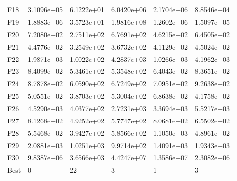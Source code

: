 \documentclass[10pt,a4paper]{article}
\begin{document}
\begin{table}[H]
\begin{center}
\begin{tabular}{llllll}
		F18  &  3.1096e+05 &  6.1222e+01 &  6.0420e+06 &  2.1704e+06 &  8.8546e+04 \\
		F19  &  1.8883e+06 &  3.5723e+01 &  1.9816e+08 &  1.2602e+06 &  1.5097e+05 \\
		F20  &  7.2080e+02 &  2.7511e+02 &  6.7691e+02 &  4.6215e+02 &  6.4505e+02 \\
		F21  &  4.4776e+02 &  3.2549e+02 &  3.6732e+02 &  4.1129e+02 &  4.5024e+02 \\
		F22  &  1.9871e+03 &  1.0022e+02 &  4.2837e+03 &  1.0266e+03 &  4.1962e+03 \\
		F23  &  8.4099e+02 &  5.3461e+02 &  5.3548e+02 &  6.4043e+02 &  8.3651e+02 \\
		F24  &  8.7878e+02 &  6.0590e+02 &  6.7249e+02 &  7.0951e+02 &  9.2638e+02 \\
		F25  &  5.0551e+02 &  3.8703e+02 &  5.3004e+02 &  6.8638e+02 &  4.1758e+02 \\
		F26  &  4.5290e+03 &  4.0377e+02 &  2.7231e+03 &  3.3694e+03 &  5.5217e+03 \\
		F27  &  8.1268e+02 &  4.9252e+02 &  5.7747e+02 &  8.0681e+02 &  6.5502e+02 \\
		F28  &  5.5468e+02 &  3.9427e+02 &  5.8566e+02 &  1.1050e+03 &  4.8961e+02 \\
		F29  &  2.0881e+03 &  1.0251e+03 &  9.9714e+02 &  1.4091e+03 &  1.9343e+03 \\
		F30  &  9.8387e+06 &  3.6566e+03 &  4.4247e+07 &  1.3586e+07 &  2.3082e+06 \\
		Best &           0 &          22 &           3 &           1 &           3 \\
		\bottomrule
	\end{tabular}
	\caption{}
\end{center}
\end{table}
\end{document}
